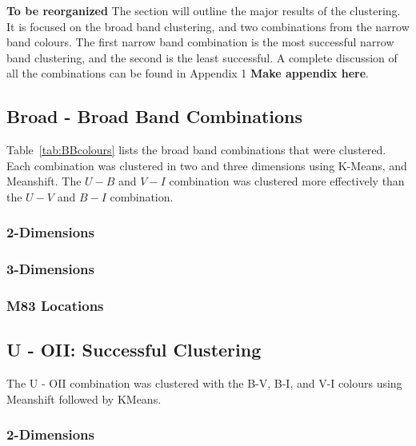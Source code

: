 
\textbf{To be reorganized}
The section will outline the major results of the clustering. 
It is focused on the broad band clustering, and two combinations from the narrow band colours.
The first narrow band combination is the most successful narrow band clustering, and the second is the least successful.
A complete discussion of all the combinations can be found in Appendix 1 \textbf{Make appendix here}.

\subsection{Broad - Broad Band Combinations}
Table~\ref{tab:BBcolours} lists the broad band combinations that were clustered. 
Each combination was clustered in two and three dimensions using K-Means, and Meanshift.
The $U - B$ and $V - I$ combination was clustered more effectively than the $U - V$ and $B - I$ combination.

\subsubsection{2-Dimensions}

\subsubsection{3-Dimensions}

\subsubsection{M83 Locations}

\subsection{U - OII: Successful Clustering}
The U - OII combination was clustered with the B-V, B-I, and V-I colours using Meanshift followed by KMeans. %

\subsubsection{2-Dimensions}

